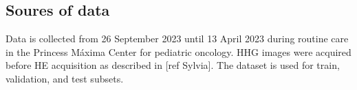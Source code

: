 \subsection{Soures of data}

Data is collected from 26 September 2023 until 13 April 2023 during routine care in the Princess Máxima Center for pediatric oncology.
HHG images were acquired before HE acquisition as described in [ref Sylvia].
The dataset is used for train, validation, and test subsets.
